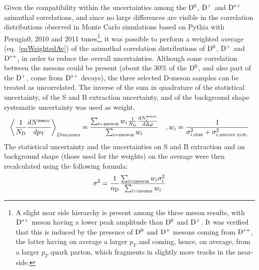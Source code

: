 %
%
%
%
Given the compatibility within the uncertainties among the ${\rm D^0}$, ${\rm D^+}$ and ${\rm D^{*+}}$ azimuthal correlations, and since no large differences are visible in the correlation distributions observed in Monte Carlo simulations based on Pythia with Perugia0, 2010 and 2011 tunes\footnote{A slight near side hierarchy is present among the three meson results, with ${\rm D^{*+}}$ meson having a lower peak amplitude than ${\rm D^0}$ and ${\rm D^+}$. It was verified that this is induced by the presence of ${\rm D^0}$ and ${\rm D^+}$ mesons coming from ${\rm D^{*+}}$, the latter having on average a larger $p_T$ and coming, hence, on average, from a larger $p_T$ quark parton, which fragments in slightly more tracks in the near-side.}, it was possible to perform a weighted average (eq.~\ref{eqWeightedAv}) of the azimuthal correlation distributions of ${\rm D^0}$, ${\rm D^+}$ and ${\rm D^{*+}}$, in order to reduce the overall uncertainties.
Although some correlation between the mesons could be present (about the 30$\%$ of the ${\rm D^0}$, and also part of the ${\rm D^+}$, come from ${\rm D^{*+}}$ decays), the three selected D-meson samples can be treated as uncorrelated. The inverse of the sum in quadrature of the statistical uncertainty, of the S and B extraction uncertainty, and of the background shape systematic uncertainty was used as weight.
\begin{equation}
  \left \langle \frac{1}{N_{\rm D}}\frac{dN^{\rm assoc}}{dp_{\rm T}} \right \rangle_{D mesons} =  \frac{\sum_{\rm i=meson}w_{i}\frac{1}{N_{\rm D}}\frac{dN^{\rm assoc}_{i}}{d\Delta\varphi}}{\sum_{\rm i=meson}w_{i}}\quad , w_{i}=\frac{1}{\sigma^{2}_{i, \rm stat}+\sigma^{2}_{i, \rm uncorr. syst.}}
\label{eqWeightedAv}
\end{equation}
The statistical uncertainty and the uncertainties on S and B extraction and on background shape (those used for the weights) on the average were then recalculated using the following formula:
\begin{equation}
  \sigma^{2}=\frac{1}{n_{\rm D}}\frac{\sum_{\rm i=meson}w_{i}\sigma^{2}_{i}}{\sum_{\rm i=meson}w_{i}}
\end{equation}
